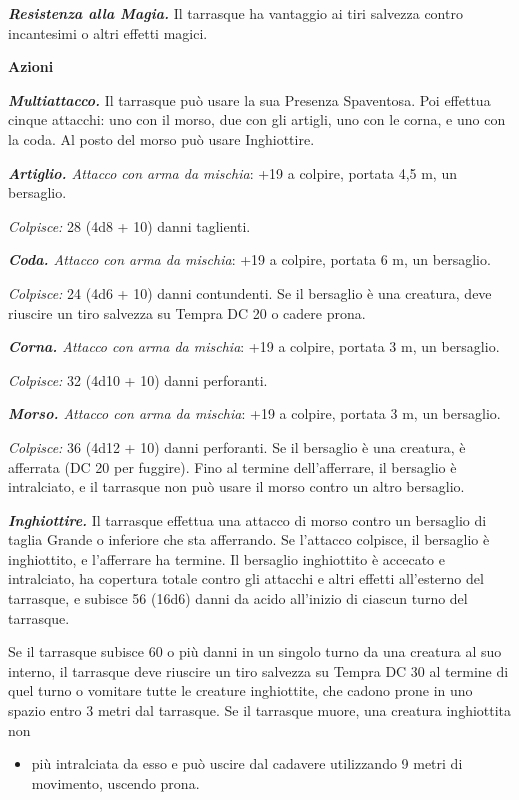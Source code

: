 \begin{multicols}{2}
\emph{\textbf{Resistenza alla Magia.}} Il tarrasque ha vantaggio ai tiri
salvezza contro incantesimi o altri effetti magici.


\textbf{Azioni}

\emph{\textbf{Multiattacco.}} Il tarrasque può usare la sua Presenza
Spaventosa. Poi effettua cinque attacchi: uno con il morso, due con gli
artigli, uno con le corna, e uno con la coda. Al posto del morso può
usare Inghiottire.

\emph{\textbf{Artiglio.} Attacco con arma da mischia}: +19 a colpire,
portata 4,5 m, un bersaglio.

\emph{Colpisce:} 28 (4d8 + 10) danni taglienti.

\emph{\textbf{Coda.} Attacco con arma da mischia}: +19 a colpire,
portata 6 m, un bersaglio.

\emph{Colpisce:} 24 (4d6 + 10) danni contundenti. Se il bersaglio è una
creatura, deve riuscire un tiro salvezza su Tempra DC 20 o cadere prona.

\emph{\textbf{Corna.} Attacco con arma da mischia}: +19 a colpire,
portata 3 m, un bersaglio.

\emph{Colpisce:} 32 (4d10 + 10) danni perforanti.

\emph{\textbf{Morso.} Attacco con arma da mischia}: +19 a colpire,
portata 3 m, un bersaglio.

\emph{Colpisce:} 36 (4d12 + 10) danni perforanti. Se il bersaglio è una
creatura, è afferrata (DC 20 per fuggire). Fino al termine
dell'afferrare, il bersaglio è intralciato, e il tarrasque non può usare
il morso contro un altro bersaglio.

\emph{\textbf{Inghiottire.}} Il tarrasque effettua una attacco di morso
contro un bersaglio di taglia Grande o inferiore che sta afferrando. Se
l'attacco colpisce, il bersaglio è inghiottito, e l'afferrare ha
termine. Il bersaglio inghiottito è accecato e intralciato, ha copertura
totale contro gli attacchi e altri effetti all'esterno del tarrasque, e
subisce 56 (16d6) danni da acido all'inizio di ciascun turno del
tarrasque.

Se il tarrasque subisce 60 o più danni in un singolo turno da una
creatura al suo interno, il tarrasque deve riuscire un tiro salvezza su Tempra DC 30 al termine di quel turno o vomitare tutte le creature
inghiottite, che cadono prone in uno spazio entro 3 metri dal tarrasque.
Se il tarrasque muore, una creatura inghiottita non


\begin{itemize}
\item
  più intralciata da esso e può uscire dal cadavere utilizzando 9 metri
  di movimento, uscendo prona.
\end{itemize}



\end{multicols}
